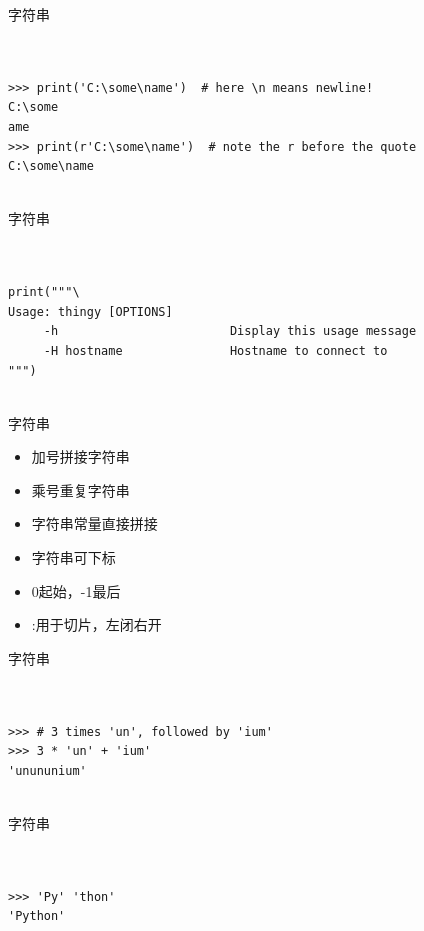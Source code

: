 \documentclass{beamer}
\begin{document}
\begin{frame}[t,fragile]{字符串}


\begin{verbatim}


>>> print('C:\some\name')  # here \n means newline!
C:\some
ame
>>> print(r'C:\some\name')  # note the r before the quote
C:\some\name


\end{verbatim}


\end{frame}



\begin{frame}[t,fragile]{字符串}


\begin{verbatim}


print("""\
Usage: thingy [OPTIONS]
     -h                        Display this usage message
     -H hostname               Hostname to connect to
""")


\end{verbatim}


\end{frame}

\begin{frame}[t]{字符串}

\begin{itemize}
    \item 加号拼接字符串
    \item 乘号重复字符串
    \item 字符串常量直接拼接
    \item 字符串可下标
    \item 0起始，-1最后
    \item :用于切片，左闭右开
\end{itemize}

\end{frame}


\begin{frame}[t,fragile]{字符串}


\begin{verbatim}


>>> # 3 times 'un', followed by 'ium'
>>> 3 * 'un' + 'ium'
'unununium'


\end{verbatim}


\end{frame}



\begin{frame}[t,fragile]{字符串}


\begin{verbatim}


>>> 'Py' 'thon'
'Python'


\end{verbatim}


\end{frame}
\end{document}
